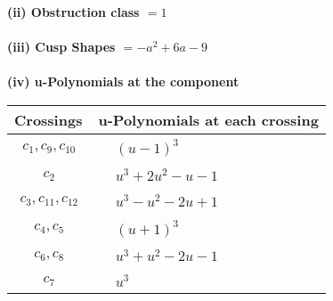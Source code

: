 \documentclass[1p]{elsarticle_modified}
\theoremstyle{definition}
\begin{document}
\flushleft \textbf{(ii) Obstruction class $= 1$}\\~\\
\flushleft \textbf{(iii) Cusp Shapes $= - a^2+6 a-9$}\\~\\
\newpage\renewcommand{\arraystretch}{1}
\flushleft \textbf{(iv) u-Polynomials at the component}\newline \\
\begin{tabular}{m{50pt}|m{274pt}}
Crossings & \hspace{64pt}u-Polynomials at each crossing \\
\hline $$\begin{aligned}c_{1},c_{9},c_{10}\end{aligned}$$&$\begin{aligned}
&(u-1)^3
\end{aligned}$\\
\hline $$\begin{aligned}c_{2}\end{aligned}$$&$\begin{aligned}
&u^3+2 u^2- u-1
\end{aligned}$\\
\hline $$\begin{aligned}c_{3},c_{11},c_{12}\end{aligned}$$&$\begin{aligned}
&u^3- u^2-2 u+1
\end{aligned}$\\
\hline $$\begin{aligned}c_{4},c_{5}\end{aligned}$$&$\begin{aligned}
&(u+1)^3
\end{aligned}$\\
\hline $$\begin{aligned}c_{6},c_{8}\end{aligned}$$&$\begin{aligned}
&u^3+u^2-2 u-1
\end{aligned}$\\
\hline $$\begin{aligned}c_{7}\end{aligned}$$&$\begin{aligned}
&u^3
\end{aligned}$\\
\hline
\end{tabular}\\~\\
\end{document}
